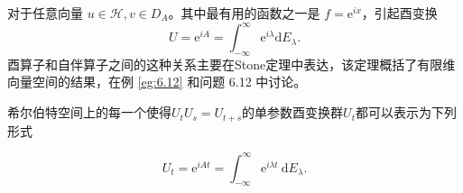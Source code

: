 对于任意向量 \(u \in \mathcal{H}, v \in D_{A}\)。其中最有用的函数之一是 \(f=\mathrm{e}^{i x}\)，引起酉变换
\[
U=\mathrm{e}^{i A}=\int_{-\infty}^{\infty} \mathrm{e}^{i \lambda} \mathrm{d} E_{\lambda} .
\]
酉算子和自伴算子之间的这种关系主要在Stone定理中表达，该定理概括了有限维向量空间的结果，在例 \ref{eg:6.12} 和问题 6.12 中讨论。
\begin{theorem}
    希尔伯特空间上的每一个使得\(U_{t} U_{s}=U_{t+s}\)的单参数酉变换群\(U_{t}\)都可以表示为下列形式
\end{theorem}
\[
U_{t}=\mathrm{e}^{i A t}=\int_{-\infty}^{\infty} \mathrm{e}^{i \lambda t} \mathrm{~d} E_{\lambda} .
\]
